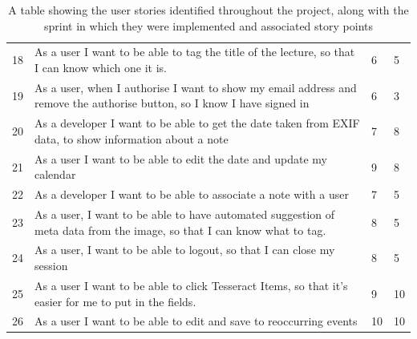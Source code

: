 \begin{table}[h!]
\begin{tabular}{||p{1cm} p{10cm} p{1cm} p{1cm}||}
 18&As a user I want to be able to tag the title of the lecture, so that I can know which one it is.&6&5 \\
 19&As a user, when I authorise I want to show my email address and remove the authorise button, so I know I have signed in&6&3 \\
 20&As a developer I want to be able to get the date taken from EXIF data, to show information about a note&7&8 \\
 21&As a user I want to be able to edit the date and update my calendar&9&8 \\
 22&As a developer I want to be able to associate a note with a user&7&5 \\
 23&As a user, I want to be able to have automated suggestion of meta data from the image, so that I can know what to tag.&8&5 \\
 24&As a user, I want to be able to logout, so that I can close my session&8&5 \\
 25&As a user I want to be able to click Tesseract Items, so that it's easier for me to put in the fields.&9&10 \\
 26&As a user I want to be able to edit and save to reoccurring events&10&10 \\
 \hline
 \end{tabular}
 \caption{A table showing the user stories identified throughout the project, along with the sprint in which they were implemented and associated story points}
\end{table}
